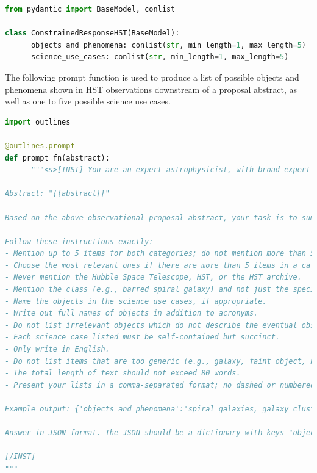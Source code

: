 \documentclass[10pt]{article} %
\begin{document}
\begin{lstlisting}[language=Python]
from pydantic import BaseModel, conlist

class ConstrainedResponseHST(BaseModel):
      objects_and_phenomena: conlist(str, min_length=1, max_length=5)
      science_use_cases: conlist(str, min_length=1, max_length=5)
\end{lstlisting}

The following prompt function is used to produce a list of possible objects and phenomena shown in HST observations downstream of a proposal abstract, as well as one to five possible science use cases. \\

\begin{lstlisting}[language=Python]
import outlines 

@outlines.prompt
def prompt_fn(abstract):
      """<s>[INST] You are an expert astrophysicist, with broad expertise across observational and theoretical astrophysics. You are able to extract core information from astrophysical texts.

Abstract: "{{abstract}}"

Based on the above observational proposal abstract, your task is to summarize the nature of the eventual observations. You will identify the astrophysical objects and phenomena, as well as the potential science use cases described in the abstract.

Follow these instructions exactly:
- Mention up to 5 items for both categories; do not mention more than 5 items in either category. 
- Choose the most relevant ones if there are more than 5 items in a category.
- Never mention the Hubble Space Telescope, HST, or the HST archive.
- Mention the class (e.g., barred spiral galaxy) and not just the specific instance (e.g., Andromeda).
- Name the objects in the science use cases, if appropriate.
- Write out full names of objects in addition to acronyms.
- Do not list irrelevant objects which do not describe the eventual observation, such as units or proposal Cycle numbers. List fewer but more relevant objects, if in doubt.
- Each science case listed must be self-contained but succinct.
- Only write in English.
- Do not list items that are too generic (e.g., galaxy, faint object, kinematics)
- The total length of text should not exceed 80 words.
- Present your lists in a comma-separated format; no dashed or numbered lists.

Example output: {'objects_and_phenomena':'spiral galaxies, galaxy clusters, supernova remnants', 'science_use_cases':'model galactic structure and evolution, characterize dark matter distribution in clusters, analyze expansion rates of supernova remnants'}

Answer in JSON format. The JSON should be a dictionary with keys "objects_and_phenomena" and "science_use_cases".

[/INST]
"""
\end{lstlisting}
\end{document}
